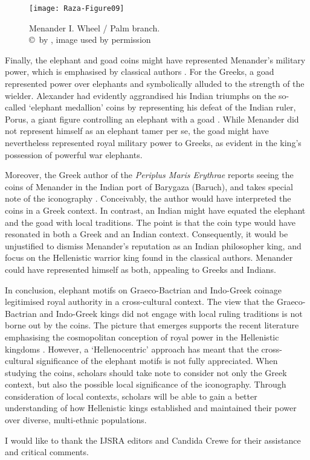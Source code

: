 \documentclass{ijsra}
\begin{document}
\begin{figure}[!htb] %
	\centering
	\texttt{[image: Raza-Figure09]}
	\caption{Menander I. Wheel / Palm branch.
		{\normalfont\scriptsize \\ \copyright\ by \cite{Coin}, image used by permission}}
	\label{fig:Raza-Figure09}
\end{figure}

Finally, the elephant and goad coins might have represented Menander’s military power, which is emphasised by classical authors \parencite[644]{Mairs2015}.
For the Greeks, a goad represented power over elephants and symbolically alluded to the strength of the wielder.
Alexander had evidently aggrandised his Indian triumphs on the so-called ‘elephant medallion’ coins by representing his defeat of the Indian ruler, Porus, a giant figure controlling an elephant with a goad \parencites[151--152]{Holt2003}[204--205]{Stewart1993}.
While Menander did not represent himself as an elephant tamer per se, the goad might have nevertheless represented royal military power to Greeks, as evident in the king’s possession of powerful war elephants. 

Moreover, the Greek author of the \emph{Periplus Maris Erythrae} reports seeing the coins of Menander in the Indian port of Barygaza (Baruch), and takes special note of the iconography .
Conceivably, the author would have interpreted the coins in a Greek context. In contrast, an Indian might have equated the elephant and the goad with local traditions.
The point is that the coin type would have resonated in both a Greek and an Indian context.
Consequently, it would be unjustified to dismiss Menander’s reputation as an Indian philosopher king, and focus on the Hellenistic warrior king found in the classical authors.
Menander could have represented himself as both, appealing to Greeks and Indians.

In conclusion, elephant motifs on Graeco-Bactrian and Indo-Greek coinage legitimised royal authority in a cross-cultural context.
The view that the Graeco-Bactrian and Indo-Greek kings did not engage with local ruling traditions is not borne out by the coins.
The picture that emerges supports the recent literature emphasising the cosmopolitan conception of royal power in the Hellenistic kingdoms \parencite[11]{Strootman2014}.
However, a ‘Hellenocentric’ approach has meant that the cross-cultural significance of the elephant motifs is not fully appreciated.
When studying the coins, scholars should take note to consider not only the Greek context, but also the possible local significance of the iconography.
Through consideration of local contexts, scholars will be able to gain a better understanding of how Hellenistic kings established and maintained their power over diverse, multi-ethnic populations.

\IJSRAseparator
I  would like to thank the IJSRA editors and Candida Crewe for their assistance and critical comments.
\IJSRAclosing%
\end{document}
